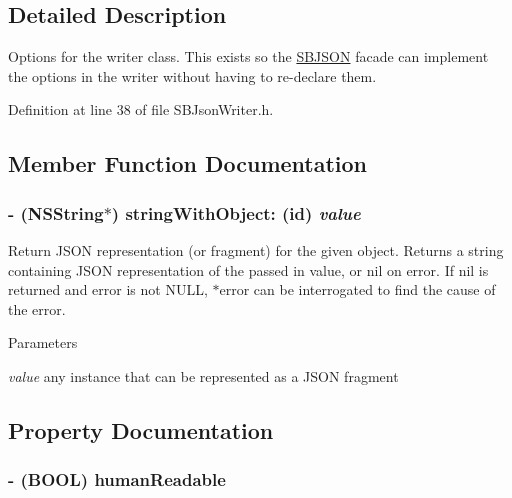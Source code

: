 \subsection{Detailed Description}
Options for the writer class. This exists so the \hyperlink{interface_s_b_j_s_o_n}{SBJSON} facade can implement the options in the writer without having to re-\/declare them. 

Definition at line 38 of file SBJsonWriter.h.

\subsection{Member Function Documentation}
\hypertarget{protocol_s_b_json_writer-p_a675b15e830d510b7fcd72f4e0a89ec45}{
\subsubsection[{stringWithObject:}]{\setlength{\rightskip}{0pt plus 5cm}-\/ ({\bf NSString}$\ast$) stringWithObject: (id) {\em value}}}
\label{protocol_s_b_json_writer-p_a675b15e830d510b7fcd72f4e0a89ec45}


Return JSON representation (or fragment) for the given object. Returns a string containing JSON representation of the passed in value, or nil on error. If nil is returned and {\ttfamily error} is not NULL, {\ttfamily $\ast$error} can be interrogated to find the cause of the error.


\begin{DoxyParams}{Parameters}
\item[{\em value}]any instance that can be represented as a JSON fragment \end{DoxyParams}


\subsection{Property Documentation}
\hypertarget{protocol_s_b_json_writer-p_a69f531597668b4b3c20aabee1e3d4558}{
\subsubsection[{humanReadable}]{\setlength{\rightskip}{0pt plus 5cm}-\/ (BOOL) humanReadable}}
\label{protocol_s_b_json_writer-p_a69f531597668b4b3c20aabee1e3d4558}


